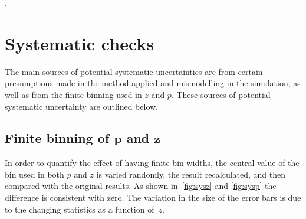 
. %


\clearpage
 
\section{Systematic checks}
\label{sec:sys}

The main sources of potential systematic uncertainties are from certain presumptions made in the method applied and mismodelling in the simulation, as well as from the finite binning used in $z$ and $p$. These sources of potential systematic uncertainty are outlined below.

\subsection[{Finite binning of $p$ and $z$}]{Finite binning of $\mathbold{p}$ and $\mathbold{z}$}
In order to quantify the effect of having finite bin widths, the central value of the bin used in both $p$ and $z$ is varied randomly, the result recalculated, and then compared with the original results. As shown in~\autoref{fig:sysz} and \ref{fig:sysp} the difference is consistent with zero. The variation in the size of the error bars is due to the changing statistics as a function of~$z$.


